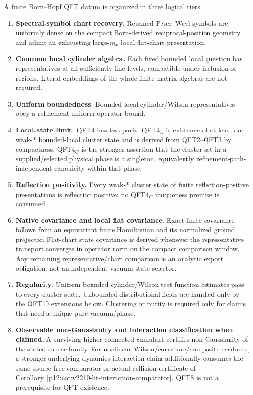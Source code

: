 \documentclass[12pt,a4paper]{article}
\begin{document}
\begin{definition}
\label{p12:def:qft-obligations}
A finite Born--Hopf QFT datum is organized in three logical tiers.
\begin{enumerate}[label=\textnormal{(QFT\arabic*)}, leftmargin=3.4em]
\item \textbf{Spectral-symbol chart recovery.} Retained Peter--Weyl symbols are uniformly dense on the compact Born-derived reciprocal-position geometry and admit an exhausting large-\(m_x\) local flat-chart presentation.
\item \textbf{Common local cylinder algebra.} Each fixed bounded local question has representatives at all sufficiently fine levels, compatible under inclusion of regions. Literal embeddings of the whole finite matrix algebras are not required.
\item \textbf{Uniform boundedness.} Bounded local cylinder/Wilson representatives obey a refinement-uniform operator bound.
\item \textbf{Local-state limit.} QFT4 has two parts.  QFT4\(_E\) is existence of at least one weak-* bounded-local cluster state and is derived from QFT2--QFT3 by compactness.  QFT4\(_C\) is the stronger assertion that the cluster set in a supplied/selected physical phase is a singleton, equivalently refinement-path-independent canonicity within that phase.
\item \textbf{Reflection positivity.} Every weak-* cluster state of finite reflection-positive presentations is reflection positive; no QFT4\(_C\) uniqueness premise is consumed.
\item \textbf{Native covariance and local flat covariance.} Exact finite covariance follows from an equivariant finite Hamiltonian and its normalized ground projector.  Flat-chart state covariance is derived whenever the representative transport converges in operator norm on the compact comparison window.  Any remaining representative/chart comparison is an analytic export obligation, not an independent vacuum-state selector.
\item \textbf{Regularity.} Uniform bounded cylinder/Wilson test-function estimates pass to every cluster state.  Unbounded distributional fields are handled only by the QFT10 extensions below.  Clustering or purity is required only for claims that need a unique pure vacuum/phase.
\item \textbf{Observable non-Gaussianity and interaction classification when claimed.} A surviving higher connected cumulant certifies non-Gaussianity of the stated source family. For nonlinear Wilson/curvature/composite readouts, a stronger underlying-dynamics interaction claim additionally consumes the same-source free-comparator or actual collision certificate of Corollary~\ref{p12:cor:v2210-lit-interaction-comparator}. QFT8 is not a prerequisite for QFT existence.

\end{enumerate}
\end{definition}
\end{document}
